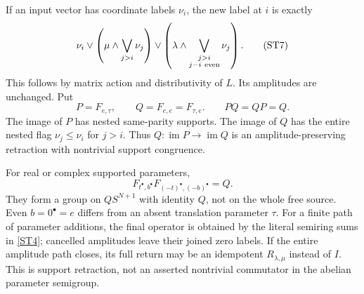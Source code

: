 \documentclass[11pt,a4paper]{article}
\theoremstyle{definition}\newtheorem{definition}[theorem]{Definition}
\newcommand{\im}{\operatorname{im}}\newcommand{\tr}{\operatorname{Tr}}
\begin{document}
If an input vector has coordinate labels $\nu_i$, the new label at $i$ is exactly
\begin{equation}
 \nu_i\vee\left(\mu\wedge\bigvee_{j>i}\nu_j\right)
 \vee\left(\lambda\wedge
       \bigvee_{\substack{j>i\\j-i\ {\rm even}}}\nu_j\right).
                                                               \tag{ST7}\label{ST7}
\end{equation}
This follows by matrix action and distributivity of $L$. Its amplitudes are unchanged. Put
\begin{equation}
 P=F_{e,\tau},\qquad Q=F_{e,e}=F_{\tau,e}.
 \qquad PQ=QP=Q.                                               \tag{ST8}\label{ST8}
\end{equation}
The image of $P$ has nested same-parity supports. The image of $Q$ has the entire nested flag $\nu_j\le\nu_i$ for $j>i$. Thus $Q:\im P\to\im Q$ is an amplitude-preserving retraction with nontrivial support congruence.

For real or complex supported parameters,
\begin{equation}
 F_{t^\bullet,b^\bullet}F_{(-t)^\bullet,(-b)^\bullet}=Q.
                                                               \tag{ST9}\label{ST9}
\end{equation}
They form a group on $QS^{N+1}$ with identity $Q$, not on the whole free source. Even $b=0^\bullet=e$ differs from an absent translation parameter $\tau$. For a finite path of parameter additions, the final operator is obtained by the literal semiring sums in \eqref{ST4}; cancelled amplitudes leave their joined zero labels. If the entire amplitude path closes, its full return may be an idempotent $R_{\lambda,\mu}$ instead of $I$. This is support retraction, not an asserted nontrivial commutator in the abelian parameter semigroup.
\end{document}
